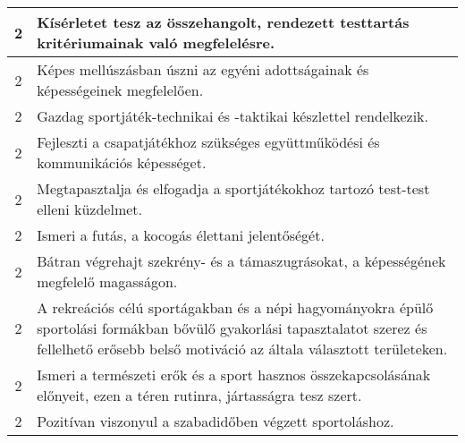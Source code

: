 \begin{longtable}{c | p{12cm} }
                                
                                          2 &  Kísérletet tesz az összehangolt, rendezett testtartás kritériumainak való megfelelésre. \\ \hline
                                          2 &  Képes mellúszásban úszni az egyéni adottságainak és képességeinek megfelelően. \\ \hline
                                          2 &  Gazdag sportjáték-technikai és -taktikai készlettel rendelkezik. \\ \hline
                                          2 &  Fejleszti a csapatjátékhoz szükséges együttműködési és kommunikációs képességet. \\ \hline
                                          2 &  Megtapasztalja és elfogadja a sportjátékokhoz tartozó test-test elleni küzdelmet. \\ \hline
                                          2 &  Ismeri a futás, a kocogás élettani jelentőségét. \\ \hline
                                          2 &  Bátran végrehajt szekrény- és a támaszugrásokat, a képességének megfelelő magasságon. \\ \hline
                                          2 &  A rekreációs célú sportágakban és a népi hagyományokra épülő sportolási formákban bővülő gyakorlási tapasztalatot szerez és fellelhető erősebb belső motiváció az általa választott területeken. \\ \hline
                                          2 &  Ismeri a természeti erők és a sport hasznos összekapcsolásának előnyeit, ezen a téren rutinra, jártasságra tesz szert. \\ \hline
                                          2 &  Pozitívan viszonyul a szabadidőben végzett sportoláshoz. \\ \hline
                                      

\end{longtable}
